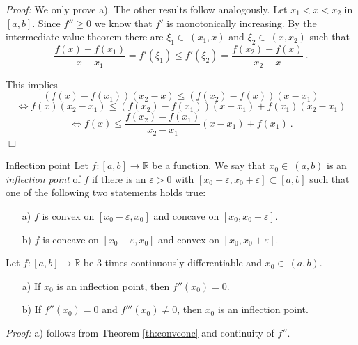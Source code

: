 {\em Proof:} We only prove a). The other results follow analogously. 
  Let $x_1<x<x_2$ in $[a,b]$. Since $f''\geq 0$ we know that $f'$ is monotonically increasing.
  By the intermediate value theorem there are $\xi_1\in~(x_1,x)$ and $\xi_2\in~(x,x_2)$ such that
  $$
    \frac{f(x)-f(x_1)}{x-x_1} = f'(\xi_1) \leq f'(\xi_2) = \frac{f(x_2)-f(x)}{x_2-x} \ .
  $$

  This implies
  $$
    (f(x)-f(x_1))(x_2-x) \leq (f(x_2)-f(x))(x-x_1)
  $$
  $$
    \Leftrightarrow f(x)(x_2-x_1) \leq (f(x_2)-f(x_1))(x-x_1)+f(x_1)(x_2-x_1) 
  $$
  $$
    \Leftrightarrow f(x) \leq \frac{f(x_2)-f(x_1)}{x_2-x_1}(x-x_1)+f(x_1)\ .   
  $$
$\Box$

\begin{Definition}{Inflection point}
    Let $f:[a,b]\rightarrow \mathbb{R}$ be a function. We say that $x_0\in ~(a,b)$ is an \emph{inflection point} of $f$ if there is an $\varepsilon>0$ with 
    $[x_0-\varepsilon,x_0+\varepsilon]\subset[a,b]$ such that one of the following two statements holds true:
    \begin{enumerate}
     \item[a)] $f$ is convex on $[x_0-\varepsilon,x_0]$ and concave on $[x_0,x_0+\varepsilon]$.
     \item[b)] $f$ is concave on $[x_0-\varepsilon,x_0]$ and convex on $[x_0,x_0+\varepsilon]$.
    \end{enumerate}
\end{Definition}

\begin{Theorem}{}
    Let $f:[a,b]\rightarrow \mathbb{R}$ be 3-times continuously differentiable and $x_0\in~(a,b)$. 
  \begin{enumerate}
   \item[a)] If $x_0$ is an inflection point, then $f''(x_0)=0$.
   \item[b)] If $f''(x_0)=0$ and $f'''(x_0)\neq 0$, then $x_0$ is an inflection point.  
  \end{enumerate}
\end{Theorem}

{\em Proof:} 
a) follows from Theorem \ref{th:convconc} and continuity of $f''$.


